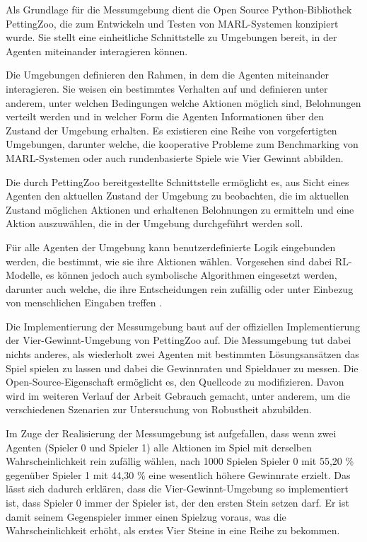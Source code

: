 
Als Grundlage für die Messumgebung dient die Open Source Python-Bibliothek PettingZoo, die zum Entwickeln und Testen von MARL-Systemen konzipiert wurde. Sie stellt eine einheitliche Schnittstelle zu Umgebungen bereit, in der Agenten miteinander interagieren können.

Die Umgebungen definieren den Rahmen, in dem die Agenten miteinander interagieren. Sie weisen ein bestimmtes Verhalten auf und definieren unter anderem, unter welchen Bedingungen welche Aktionen möglich sind, Belohnungen verteilt werden und in welcher Form die Agenten Informationen über den Zustand der Umgebung erhalten. Es existieren eine Reihe von vorgefertigten Umgebungen, darunter welche, die kooperative Probleme zum Benchmarking von MARL-Systemen oder auch rundenbasierte Spiele wie Vier Gewinnt abbilden.

Die durch PettingZoo bereitgestellte Schnittstelle ermöglicht es, aus Sicht eines Agenten den aktuellen Zustand der Umgebung zu beobachten, die im aktuellen Zustand möglichen Aktionen und erhaltenen Belohnungen zu ermitteln und eine Aktion auszuwählen, die in der Umgebung durchgeführt werden soll.

Für alle Agenten der Umgebung kann benutzerdefinierte Logik eingebunden werden, die bestimmt, wie sie ihre Aktionen wählen. Vorgesehen sind dabei RL-Modelle, es können jedoch auch symbolische Algorithmen eingesetzt werden, darunter auch welche, die ihre Entscheidungen rein zufällig oder unter Einbezug von menschlichen Eingaben treffen \cite{Farama.2025}.


Die Implementierung der Messumgebung baut auf der offiziellen Implementierung der Vier-Gewinnt-Umgebung von PettingZoo auf. Die Messumgebung tut dabei nichts anderes, als wiederholt zwei Agenten mit bestimmten Lösungsansätzen das Spiel spielen zu lassen und dabei die Gewinnraten und Spieldauer zu messen. Die Open-Source-Eigenschaft ermöglicht es, den Quellcode zu modifizieren. Davon wird im weiteren Verlauf der Arbeit Gebrauch gemacht, unter anderem, um die verschiedenen Szenarien zur Untersuchung von Robustheit abzubilden.

Im Zuge der Realisierung der Messumgebung ist aufgefallen, dass wenn zwei Agenten (Spieler 0 und Spieler 1) alle Aktionen im Spiel mit derselben Wahrscheinlichkeit rein zufällig wählen, nach 1000 Spielen Spieler 0 mit 55,20 \% gegenüber Spieler 1 mit 44,30 \% eine wesentlich höhere Gewinnrate erzielt. Das lässt sich dadurch erklären, dass die Vier-Gewinnt-Umgebung so implementiert ist, dass Spieler 0 immer der Spieler ist, der den ersten Stein setzen darf. Er ist damit seinem Gegenspieler immer einen Spielzug voraus, was die Wahrscheinlichkeit erhöht, als erstes Vier Steine in eine Reihe zu bekommen.

